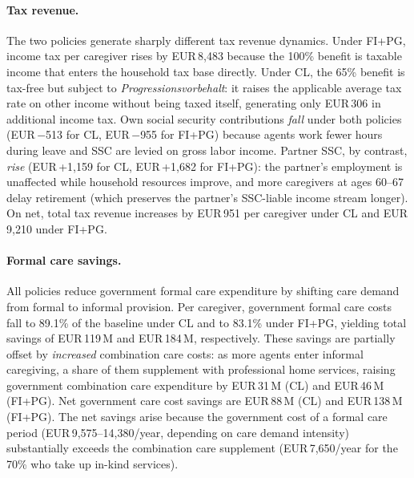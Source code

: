 \paragraph{Tax revenue.} The two policies generate sharply different tax revenue dynamics. Under FI+PG, income tax per caregiver rises by EUR\,8,483 because the 100\% benefit is taxable income that enters the household tax base directly. Under CL, the 65\% benefit is tax-free but subject to \textit{Progressionsvorbehalt}: it raises the applicable average tax rate on other income without being taxed itself, generating only EUR\,306 in additional income tax. Own social security contributions \textit{fall} under both policies (EUR\,$-$513 for CL, EUR\,$-$955 for FI+PG) because agents work fewer hours during leave and SSC are levied on gross labor income. Partner SSC, by contrast, \textit{rise} (EUR\,+1,159 for CL, EUR\,+1,682 for FI+PG): the partner's employment is unaffected while household resources improve, and more caregivers at ages 60--67 delay retirement (which preserves the partner's SSC-liable income stream longer). On net, total tax revenue increases by EUR\,951 per caregiver under CL and EUR\,9,210 under FI+PG.

\paragraph{Formal care savings.} All policies reduce government formal care expenditure by shifting care demand from formal to informal provision. Per caregiver, government formal care costs fall to 89.1\% of the baseline under CL and to 83.1\% under FI+PG, yielding total savings of EUR\,119\,M and EUR\,184\,M, respectively. These savings are partially offset by \textit{increased} combination care costs: as more agents enter informal caregiving, a share of them supplement with professional home services, raising government combination care expenditure by EUR\,31\,M (CL) and EUR\,46\,M (FI+PG). Net government care cost savings are EUR\,88\,M (CL) and EUR\,138\,M (FI+PG). The net savings arise because the government cost of a formal care period (EUR\,9,575--14,380/year, depending on care demand intensity) substantially exceeds the combination care supplement (EUR\,7,650/year for the 70\% who take up in-kind services).

